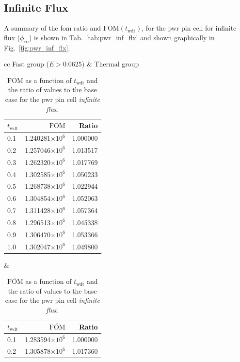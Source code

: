\subsection{Infinite Flux}
A summary of the \gls{fom} ratio and
$\overline{\mathrm{FOM}}(t_{\mathrm{wdt}})$, for the \gls{pwr} pin
cell for infinite flux ($\phi_{\infty}$) is shown in Tab.~\ref{tab:pwr_inf_flx} and
shown graphically in Fig.~\ref{fig:pwr_inf_flx}.
\begin{table}[hbtp]
  \centering
  \caption[$\overline{\mathrm{FOM}}$ and ratio for
    the \acrshort{pwr} pin cell infinite flux.]{$\overline{\mathrm{FOM}}$ as a function of
    $t_{\mathrm{wdt}}$ and the ratio of values to the base case for
    the \gls{pwr} pin cell \textit{infinite flux}.}
  \begin{tabular}{cc} Fast group ($E > 0.0625$) & Thermal group \\
\begin{tabular}{lrr}
\toprule
$t_{\mathrm{wdt}}$ &                   $\overline{\mathrm{FOM}}$ & Ratio\\
\midrule
 0.1 & 1.240281$\times 10^{6}$ & 1.000000 \\
 0.2 & 1.257046$\times 10^{6}$ & 1.013517 \\
 0.3 & 1.262320$\times 10^{6}$ & 1.017769 \\
 0.4 & 1.302585$\times 10^{6}$ & 1.050233 \\
 0.5 & 1.268738$\times 10^{6}$ & 1.022944 \\
 0.6 & 1.304854$\times 10^{6}$ & 1.052063 \\
 0.7 & 1.311428$\times 10^{6}$ & 1.057364 \\
 0.8 & 1.296513$\times 10^{6}$ & 1.045338 \\
 0.9 & 1.306470$\times 10^{6}$ & 1.053366 \\
 1.0 & 1.302047$\times 10^{6}$ & 1.049800 \\
\bottomrule
\end{tabular} &
\begin{tabular}{lrr}
\toprule
$t_{\mathrm{wdt}}$ &                   $\overline{\mathrm{FOM}}$ &
                                                                   Ratio\\
\midrule
 0.1 & 1.283594$\times 10^{6}$ & 1.000000 \\
 0.2 & 1.305878$\times 10^{6}$ & 1.017360 \\

\end{tabular}
\end{tabular}
\end{table}
